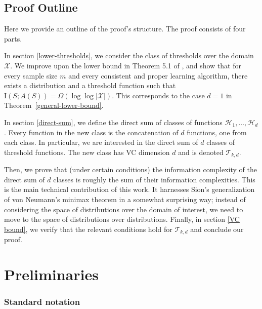 \documentclass[final,12pt]{colt2018}
\newcommand{\mc}[1]{\mathcal{#1}}
\newcommand{\mb}{\mathbb}
\newcommand{\cH}{\mc{H}}
\newcommand{\cX}{\mc{X}}
\newcommand{\cT}{\mc{T}}
\newcommand{\II}[1]{\mathrm{I}\left(#1\right)}
\newtheorem{notation}{Notation}[section]
\begin{document}
\subsection*{Proof Outline}\label{Proof Sketch}

Here we provide an outline of the proof's structure.
The proof consists of four parts.

In section \ref{lower-thresholds}, we consider the class of thresholds over 
the domain $\cX$. We improve upon the lower bound in Theorem 5.1 of \cite{bassily2018learners}, and show that for every sample size $m$ and every consistent and proper learning algorithm, there exists a distribution and a threshold function such that $\II{S;A(S)}=\Omega ( \log \log | \cX | )$. This corresponds to the case $d=1$ in Theorem~\ref{general-lower-bound}.

In section \ref{direct-sum}, we define the direct sum of classes of functions $\cH_1,\ldots,\cH_d$. Every function in the new class is the concatenation of $d$ functions, one from each class. In particular, we are interested in the direct sum of $d$ classes of threshold functions.  The new class has VC dimension $d$ and is denoted $\cT_{k,d}$.

{Then,} %
we prove that (under certain conditions) the information complexity of the direct sum of $d$ classes is roughly the sum of their information complexities. This is the main technical contribution of this work. It harnesses {Sion's generalization of} von Neumann's minimax theorem in a somewhat surprising way; instead of considering the space of distributions over the domain of interest, we need to move to the space of distributions over distributions.
Finally, in section \ref{VC bound}, we verify that the relevant conditions hold for $\cT_{k,d}$ and conclude our proof. 
	



\section{Preliminaries}\label{section-preliminaries}

\subsubsection*{Standard notation}

\end{document}
